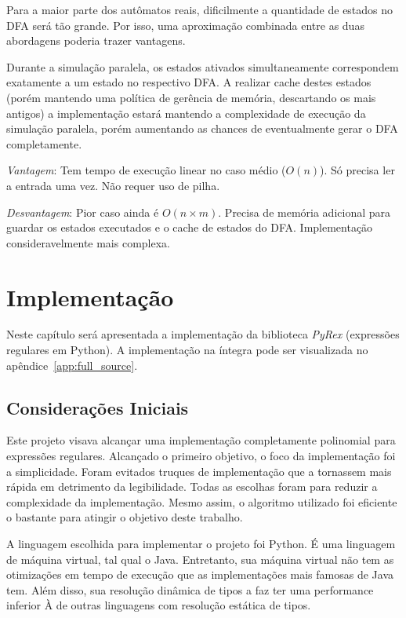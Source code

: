 \documentclass[a4paper,12pt,oneside,onecolumn]{uerj}
\begin{document}
Para a maior parte dos autômatos reais, dificilmente a quantidade de estados no DFA será tão grande. Por isso, uma aproximação combinada entre as duas abordagens poderia trazer vantagens.

Durante a simulação paralela, os estados ativados simultaneamente correspondem exatamente a um estado no respectivo DFA. A realizar cache destes estados (porém mantendo uma política de gerência de memória, descartando os mais antigos) a implementação estará mantendo a complexidade de execução da simulação paralela, porém aumentando as chances de eventualmente gerar o DFA completamente.

\emph{Vantagem}: Tem tempo de execução linear no caso médio ($O(n)$). Só precisa ler a entrada uma vez. Não requer uso de pilha.

\emph{Desvantagem}: Pior caso ainda é $O(n \times m)$. Precisa de memória adicional para guardar os estados executados e o cache de estados do DFA. Implementação consideravelmente mais complexa.

\chapter{Implementação}

Neste capítulo será apresentada a implementação da biblioteca \emph{PyRex} (expressões regulares em Python). A implementação na íntegra pode ser visualizada no apêndice~\ref{app:full_source}.

\section{Considerações Iniciais}

Este projeto visava alcançar uma implementação completamente polinomial para expressões regulares. Alcançado o primeiro objetivo, o foco da implementação foi a simplicidade. Foram evitados truques de implementação que a tornassem mais rápida em detrimento da legibilidade. Todas as escolhas foram para reduzir a complexidade da implementação. Mesmo assim, o algoritmo utilizado foi eficiente o bastante para atingir o objetivo deste trabalho.

A linguagem escolhida para implementar o projeto foi Python. É uma linguagem de máquina virtual, tal qual o Java. Entretanto, sua máquina virtual não tem as otimizações em tempo de execução que as implementações mais famosas de Java tem. Além disso, sua resolução dinâmica de tipos a faz ter uma performance inferior À de outras linguagens com resolução estática de tipos. 
\end{document}
